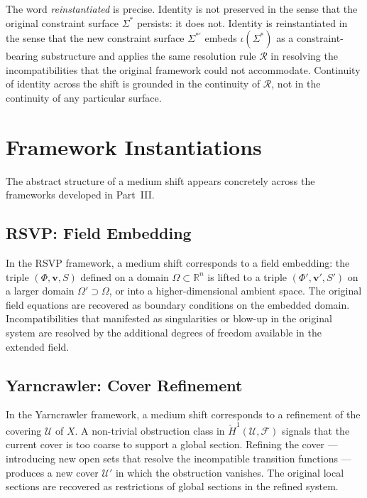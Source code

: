 \documentclass[11pt,openany]{book}
\begin{document}
The word \emph{reinstantiated} is precise.  Identity is not
preserved in the sense that the original constraint surface
$\Sigma^*$ persists: it does not.  Identity is
reinstantiated in the sense that the new constraint surface
$\Sigma^{*\prime}$ embeds $\iota(\Sigma^*)$ as a
constraint-bearing substructure and applies the same
resolution rule $\mathcal{R}$ in resolving the
incompatibilities that the original framework could not
accommodate.  Continuity of identity across the shift is
grounded in the continuity of $\mathcal{R}$, not in the
continuity of any particular surface.

\section{Framework Instantiations}
\label{sec:instantiations}

The abstract structure of a medium shift appears concretely
across the frameworks developed in Part~III.

\subsection{RSVP: Field Embedding}

In the RSVP framework, a medium shift corresponds to a
field embedding: the triple $(\Phi, \boldsymbol{v}, S)$
defined on a domain $\Omega \subset \mathbb{R}^n$ is lifted
to a triple $(\Phi', \boldsymbol{v}', S')$ on a larger
domain $\Omega' \supset \Omega$, or into a higher-dimensional
ambient space.  The original field equations are recovered
as boundary conditions on the embedded domain.
Incompatibilities that manifested as singularities or
blow-up in the original system are resolved by the
additional degrees of freedom available in the extended
field.

\subsection{Yarncrawler: Cover Refinement}

In the Yarncrawler framework, a medium shift corresponds
to a refinement of the covering $\mathcal{U}$ of $X$.  A
non-trivial obstruction class in $\check{H}^1(\mathcal{U},
\mathcal{F})$ signals that the current cover is too coarse
to support a global section.  Refining the cover ---
introducing new open sets that resolve the incompatible
transition functions --- produces a new cover $\mathcal{U}'$
in which the obstruction vanishes.  The original local
sections are recovered as restrictions of global sections
in the refined system.
\end{document}
